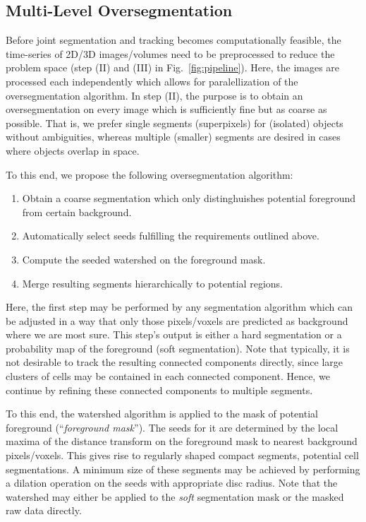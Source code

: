 \documentclass[10pt,twocolumn,letterpaper]{article}
\begin{document}
\subsection{Multi-Level Oversegmentation}
\label{sec:oversegmentation}

Before joint segmentation and tracking becomes computationally feasible, 
the time-series of 2D/3D images/volumes need to be preprocessed
to reduce the problem space (step (II) and (III) in Fig.~\ref{fig:pipeline}). 
Here, the images are processed each independently which allows for
paralellization of the oversegmentation algorithm. 
In step (II), the purpose is to obtain an oversegmentation on every image 
which is sufficiently fine but as coarse as possible.
That is, we prefer single segments (superpixels) for (isolated) objects without
ambiguities, whereas multiple (smaller) segments are desired in cases where objects overlap in space. 

To this end, we propose the following oversegmentation algorithm:
\begin{enumerate}
 \item Obtain a coarse segmentation which only distinghuishes 
potential foreground from certain background.
 \item Automatically select seeds fulfilling the requirements outlined above.
 \item Compute the seeded watershed on the foreground mask.
 \item Merge resulting segments hierarchically to potential regions.
\end{enumerate}

Here, the first step may be performed by any segmentation algorithm which can be adjusted in a way that 
only those pixels/voxels are predicted as background where we are most sure. This step's output
is either a hard segmentation or a probability map of the foreground (soft segmentation). 
Note that typically, it is not desirable to track the resulting connected components directly, since 
large clusters of cells may be contained in each connected component. Hence, we continue by 
refining these connected components to multiple segments.

To this end, the watershed algorithm is applied to the mask of potential foreground (``\emph{foreground mask}'').
The seeds for it are determined by the local maxima of the distance transform on the foreground mask
to nearest background pixels/voxels. This gives rise to regularly shaped compact segments, potential cell segmentations. 
A minimum
size of these segments may be achieved by performing a dilation operation on the seeds with appropriate disc radius.
Note that the watershed may either be applied to the \emph{soft} segmentation mask or the masked raw data directly.
\end{document}

